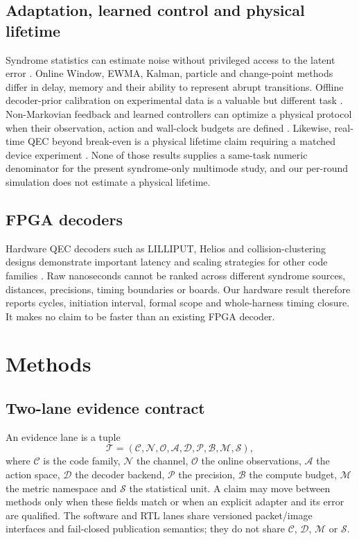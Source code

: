 \documentclass[11pt]{article}
\begin{document}
\subsection{Adaptation, learned control and physical lifetime}

Syndrome statistics can estimate noise without privileged access to the
latent error \cite{wagner2021}.  Online Window, EWMA, Kalman, particle and
change-point methods differ in delay, memory and their ability to represent
abrupt transitions.  Offline decoder-prior calibration on experimental data
is a valuable but different task \cite{sivak2024}.  Non-Markovian feedback and
learned controllers can optimize a physical protocol when their observation,
action and wall-clock budgets are defined \cite{puviani2025}.  Likewise,
real-time QEC beyond break-even is a physical lifetime claim requiring a
matched device experiment \cite{sivak2023}.  None of those results supplies a
same-task numeric denominator for the present syndrome-only multimode study,
and our per-round simulation does not estimate a physical lifetime.

\subsection{FPGA decoders}

Hardware QEC decoders such as LILLIPUT, Helios and collision-clustering designs
demonstrate important latency and scaling strategies for other code families
\cite{lilliput2022,helios2023,collision2025}.  Raw nanoseconds cannot be ranked
across different syndrome sources, distances, precisions, timing boundaries or
boards.  Our hardware result therefore reports cycles, initiation interval,
formal scope and whole-harness timing closure.  It makes no claim to be faster
than an existing FPGA decoder.

\section{Methods}

\subsection{Two-lane evidence contract}

An evidence lane is a tuple
\begin{equation}
  \mathcal T=(\mathcal C,\mathcal N,\mathcal O,\mathcal A,
  \mathcal D,\mathcal P,\mathcal B,\mathcal M,\mathcal S),
\end{equation}
where $\mathcal C$ is the code family, $\mathcal N$ the channel, $\mathcal O$
the online observations, $\mathcal A$ the action space, $\mathcal D$ the
decoder backend, $\mathcal P$ the precision, $\mathcal B$ the compute budget,
$\mathcal M$ the metric namespace and $\mathcal S$ the statistical unit.  A
claim may move between methods only when these fields match or when an explicit
adapter and its error are qualified.  The software and RTL lanes share
versioned packet/image interfaces and fail-closed publication semantics; they
do not share $\mathcal C$, $\mathcal D$, $\mathcal M$ or $\mathcal S$.
\end{document}
